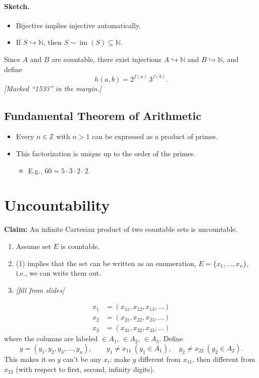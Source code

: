 \documentclass[11pt]{article}
\newcommand{\note}[1]{\textcolor{red!60!black}{\textit{[#1]}}}
\newcommand{\N}{\mathbb{N}}
\newcommand{\Z}{\mathbb{Z}}
\begin{document}
\paragraph{Sketch.}
\begin{itemize}
  \item Bijective implies injective automatically.
  \item If $S \hookrightarrow \N$, then $S \sim \operatorname{im}(S) \subseteq \N$.
\end{itemize}
Since $A$ and $B$ are countable, there exist injections $A \hookrightarrow \N$ and $B \hookrightarrow \N$, and define
\[
  h(a,b) = 2^{f(a)}\, 3^{f(b)}.
\]
\note{Marked ``1533'' in the margin.}

\subsection*{Fundamental Theorem of Arithmetic}
\begin{itemize}
  \item Every $n \in \Z$ with $n > 1$ can be expressed as a product of primes.
  \item This factorization is unique up to the order of the primes.
  \begin{itemize}
    \item E.g., $60 = 5 \cdot 3 \cdot 2 \cdot 2$.
  \end{itemize}
\end{itemize}

\section{Uncountability}

\textbf{Claim:} An infinite Cartesian product of two countable sets is uncountable.

\begin{enumerate}
  \item Assume set $E$ is countable.
  \item (1) implies that the set can be written as an enumeration, $E = \{x_1, \ldots, x_n\}$, i.e., we can write them out.
  \item \note{fill from slides}
\end{enumerate}

\[
\begin{aligned}
  x_1 &= (x_{11}, x_{12}, x_{13}, \ldots)\\
  x_2 &= (x_{21}, x_{22}, x_{23}, \ldots)\\
  x_3 &= (x_{31}, x_{32}, x_{33}, \ldots)
\end{aligned}
\]
where the columns are labeled $\in A_1$, $\in A_2$, $\in A_3$. Define
\[
  y = (y_1, y_2, y_3, \ldots, y_n), \qquad y_1 \neq x_{11}\ (y_1 \in A_1),\quad y_2 \neq x_{22}\ (y_2 \in A_2).
\]
This makes it so $y$ can't be any $x_i$: make $y$ different from $x_{11}$, then different from $x_{22}$ (with respect to first, second, infinity digits).
\end{document}
